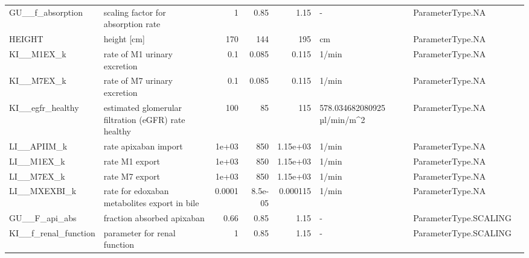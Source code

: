 \begin{tabular}{llrrrlll}
GU\_\_f\_absorption & scaling factor for absorption rate & 1 & 0.85 & 1.15 & - & ParameterType.NA &  \\
HEIGHT & height [cm] & 170 & 144 & 195 & cm & ParameterType.NA &  \\
KI\_\_M1EX\_k & rate of M1 urinary excretion & 0.1 & 0.085 & 0.115 & 1/min & ParameterType.NA &  \\
KI\_\_M7EX\_k & rate of M7 urinary excretion & 0.1 & 0.085 & 0.115 & 1/min & ParameterType.NA &  \\
KI\_\_egfr\_healthy & estimated glomerular filtration (eGFR) rate healthy & 100 & 85 & 115 & 578.034682080925 µl/min/m^2 & ParameterType.NA &  \\
LI\_\_APIIM\_k & rate apixaban import & 1e+03 & 850 & 1.15e+03 & 1/min & ParameterType.NA &  \\
LI\_\_M1EX\_k & rate M1 export & 1e+03 & 850 & 1.15e+03 & 1/min & ParameterType.NA &  \\
LI\_\_M7EX\_k & rate M7 export & 1e+03 & 850 & 1.15e+03 & 1/min & ParameterType.NA &  \\
LI\_\_MXEXBI\_k & rate for edoxaban metabolites export in bile & 0.0001 & 8.5e-05 & 0.000115 & 1/min & ParameterType.NA &  \\
GU\_\_F\_api\_abs & fraction absorbed apixaban & 0.66 & 0.85 & 1.15 & - & ParameterType.SCALING &  \\
KI\_\_f\_renal\_function & parameter for renal function & 1 & 0.85 & 1.15 & - & ParameterType.SCALING & \cite{Stevens2024} \\
\bottomrule
\end{tabular}

